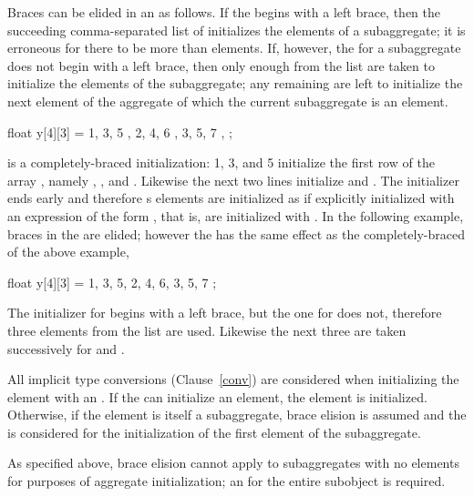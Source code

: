 \pnum
Braces can be elided in an
as follows.
If the
begins with a left brace,
then the succeeding comma-separated list of
initializes the elements of a subaggregate;
it is erroneous for there to be more
than elements.
If, however, the
for a subaggregate does not begin with a left brace,
then only enough
from the list are taken to initialize the elements of the subaggregate;
any remaining
are left to initialize the next element of the aggregate
of which the current subaggregate is an element.
\begin{example}

\begin{codeblock}
float y[4][3] = {
  { 1, 3, 5 },
  { 2, 4, 6 },
  { 3, 5, 7 },
};
\end{codeblock}

is a completely-braced initialization:
1, 3, and 5 initialize the first row of the array
,
namely
,
,
and
.
Likewise the next two lines initialize
and
.
The initializer ends early and therefore
s
elements are initialized as if explicitly initialized with an
expression of the form
,
that is, are initialized with
.
In the following example, braces in the
are elided;
however the
has the same effect as the completely-braced
of the above example,

\begin{codeblock}
float y[4][3] = {
  1, 3, 5, 2, 4, 6, 3, 5, 7
};
\end{codeblock}

The initializer for
begins with a left brace, but the one for
does not,
therefore three elements from the list are used.
Likewise the next three are taken successively for
and
.
\end{example}

\pnum
All implicit type conversions (Clause~\ref{conv}) are considered when
initializing the element with an .
If the
can initialize an element, the element is initialized.
Otherwise, if the element is itself a subaggregate,
brace elision is assumed and the
is considered for the initialization of the first element of the subaggregate.
\begin{note} As specified above, brace elision cannot apply to
subaggregates with no elements for purposes of aggregate initialization; an
 for the entire subobject is
required.\end{note}

